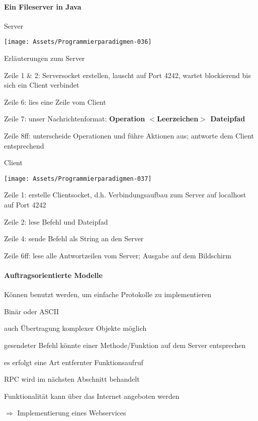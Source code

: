 \documentclass[10pt]{article}
\begin{document}
\paragraph{Ein Fileserver in Java}
Server
\begin{center}
  \centering
  \texttt{[image: Assets/Programmierparadigmen-036]}
\end{center}
Erläuterungen zum Server
\begin{itemize*}
  \item Zeile 1 \& 2: Serversocket erstellen, lauscht auf Port 4242, wartet blockierend bis sich ein Client verbindet
  \item Zeile 6: lies eine Zeile vom Client
  \item Zeile 7: unser Nachrichtenformat: \textbf{Operation $<$Leerzeichen$>$ Dateipfad}
  \item Zeile 8ff: unterscheide Operationen und führe Aktionen aus; antworte dem Client entsprechend
\end{itemize*}

Client
\begin{center}
  \centering
  \texttt{[image: Assets/Programmierparadigmen-037]}
\end{center}
\begin{itemize*}
  \item Zeile 1: erstelle Clientsocket, d.h. Verbindungsaufbau zum Server auf localhost auf Port 4242
  \item Zeile 2: lese Befehl und Dateipfad
  \item Zeile 4: sende Befehl als String an den Server
  \item Zeile 6ff: lese alle Antwortzeilen vom Server; Ausgabe auf dem Bildschirm
\end{itemize*}

\paragraph{Auftragsorientierte Modelle}
\begin{itemize*}
  \item Können benutzt werden, um einfache Protokolle zu implementieren
  \item Binär oder ASCII
  \begin{itemize*}
    \item auch Übertragung komplexer Objekte möglich
  \end{itemize*}
  \item gesendeter Befehl könnte einer Methode/Funktion auf dem Server entsprechen
  \begin{itemize*}
    \item es erfolgt eine Art entfernter Funktionsaufruf
    \item RPC wird im nächsten Abschnitt behandelt
  \end{itemize*}
  \item Funktionalität kann über das Internet angeboten werden
  \begin{itemize*}
    \item[$\Rightarrow$] Implementierung eines Webservices
  \end{itemize*}
\end{itemize*}
\end{document}
